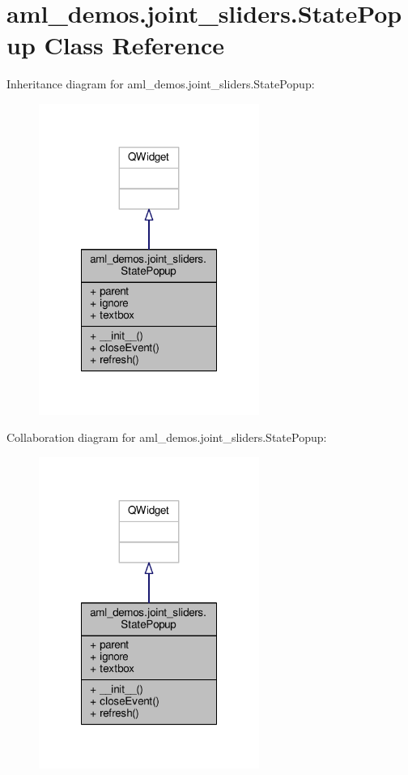 \hypertarget{classaml__demos_1_1joint__sliders_1_1_state_popup}{\section{aml\-\_\-demos.\-joint\-\_\-sliders.\-State\-Popup Class Reference}
\label{classaml__demos_1_1joint__sliders_1_1_state_popup}
}


Inheritance diagram for aml\-\_\-demos.\-joint\-\_\-sliders.\-State\-Popup\-:
\nopagebreak
\begin{figure}[H]
\begin{center}
\leavevmode
\includegraphics[width=204pt]{classaml__demos_1_1joint__sliders_1_1_state_popup__inherit__graph}
\end{center}
\end{figure}


Collaboration diagram for aml\-\_\-demos.\-joint\-\_\-sliders.\-State\-Popup\-:
\nopagebreak
\begin{figure}[H]
\begin{center}
\leavevmode
\includegraphics[width=204pt]{classaml__demos_1_1joint__sliders_1_1_state_popup__coll__graph}
\end{center}
\end{figure}
